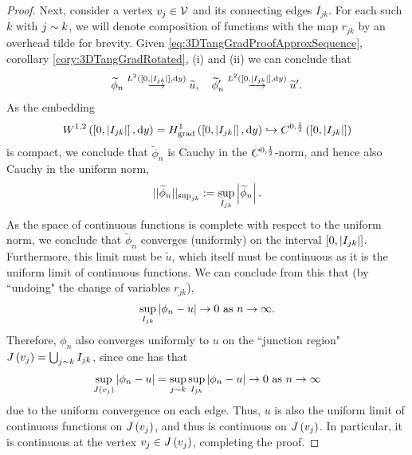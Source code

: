 \begin{proof}
	Next, consider a vertex $v_j\in\mathcal{V}$ and its connecting edges $I_{jk}$.
	For each such $k$ with $j\sim k$, we will denote composition of functions with the map $r_{jk}$ by an overhead tilde for brevity.
	Given \eqref{eq:3DTangGradProofApproxSequence}, corollary \ref{cory:3DTangGradRotated}, (i) and (ii) we can conclude that
	\begin{align*}
		\widetilde{\phi}_n \overset{L^{2}\left( \left[ 0,\left\lvert I_{jk} \right\rvert \right],\mathrm{d}y \right)}{\longrightarrow} \widetilde{u},
		\quad
		\widetilde{\phi}_n' \overset{L^{2}\left( \left[ 0,\left\lvert I_{jk} \right\rvert \right],\mathrm{d}y \right)}{\longrightarrow} \widetilde{u}'.
	\end{align*}
	As the embedding
	\begin{align*}
		W^{1,2}\left( \left[ 0,\left\lvert I_{jk} \right\rvert \right],\mathrm{d} y \right) = H^1_\mathrm{grad}\left( \left[ 0,\left\lvert I_{jk} \right\rvert \right], \mathrm{d}y \right) \hookrightarrow C^{0,\frac{1}{2}}\left( \left[ 0,\left\lvert I_{jk} \right\rvert \right] \right)
	\end{align*}
	is compact,  we conclude that $\widetilde{\phi}_n$ is Cauchy in the $C^{0,\frac{1}{2}}$-norm, and hence also Cauchy in the uniform norm,
	\begin{align*}
		\lvert\lvert \widetilde{\phi}_n \rvert\rvert_{\sup_{jk}} := \sup_{I_{jk}}\left\lvert \widetilde{\phi}_n \right\rvert.
	\end{align*}
	As the space of continuous functions is complete with respect to the uniform norm, we conclude that $\widetilde{\phi}_n$ converges (uniformly) on the interval $\left[ 0,\left\lvert I_{jk} \right\rvert \right]$.
	Furthermore, this limit must be $\widetilde{u}$, which itself must be continuous as it is the uniform limit of continuous functions.
	We can conclude from this that (by ``undoing" the change of variables $r_{jk}$),
	\begin{align*}
		\sup_{I_{jk}}\left\lvert \phi_n - u \right\rvert \rightarrow 0 \ \text{as} \ n \rightarrow\infty.
	\end{align*}
	Therefore, $\phi_n$ also converges uniformly to $u$ on the ``junction region" $J\left( v_j \right) = \bigcup_{j\sim k}I_{jk}$, since one has that
	\begin{align*}
		\sup_{J\left( v_j \right)}\left\lvert \phi_n - u \right\rvert = \sup_{j\sim k}\sup_{I_{jk}}\left\lvert \phi_n - u \right\rvert \rightarrow 0 \ \text{as} \ n \rightarrow\infty
	\end{align*}
	due to the uniform convergence on each edge.
	Thus, $u$ is also the uniform limit of continuous functions on $J\left( v_j \right)$, and thus is continuous on $J\left( v_j \right)$.
	In particular, it is continuous at the vertex $v_j\in J\left( v_j \right)$, completing the proof.
\end{proof}

